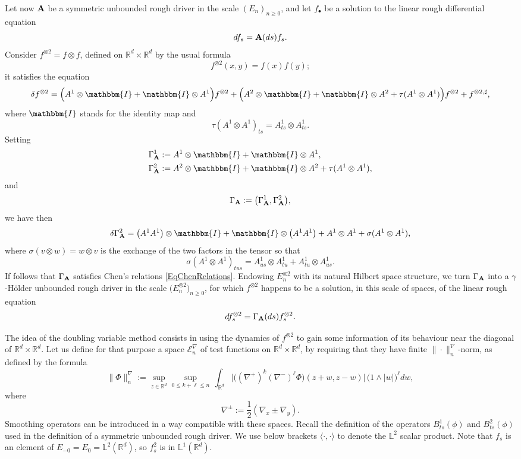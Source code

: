 \documentclass[11pt,a4paper]{amsart}
\newcommand{\RR}{\mathbb{R}}  \newcommand{\CC}{\mathbb{C}}  \newcommand{\LL}{\mathbb{L}}  \newcommand{\WW}{\mathbb{W}}
\newcommand{\mcE}{\mathcal{E}}
\renewcommand{\geq}{\geqslant}
\newcommand{\ssk}{\smallskip}
\numberwithin{equation}{section} %
\begin{document}
\bigskip 
 
Let now $\bf A$ be a symmetric unbounded rough driver in the scale $(E_n)_{n\geq 0}$, and let $f_\bullet$ be a solution to the linear rough differential equation 
$$ 
df_s = {\bf A}(ds)f_s.
$$
Consider $f^{\otimes 2} = f \otimes f$, defined on $\RR^d\times\RR^d$ by the usual formula
$$
f^{\otimes 2}(x,y) = f(x)f(y); 
$$ 
it satisfies the equation
$$ 
\delta f^{\otimes 2} = \Big( A^1  \otimes \mathbbm{I}+\mathbbm{I} \otimes A^1 \Big) f^{\otimes 2} + \Big(A^2 \otimes \mathbbm{I}+\mathbbm{I} \otimes A^2 + \tau (A^1 \otimes A^1)\Big) f^{\otimes 2} + f^{\otimes 2, \sharp},
$$
where $\mathbbm{I}$ stands for the identity map and
$$
\tau (A^1 \otimes A^1)_{t s} = A^1_{t s} \otimes A^1_{t s}.
$$
Setting 
\begin{equation*}
\begin{split}
&\Gamma_{\bfA}^1 := A^1  \otimes \mathbbm{I}+\mathbbm{I} \otimes A^1, \\
&\Gamma_{\bfA}^2 := A^2 \otimes \mathbbm{I}+\mathbbm{I} \otimes A^2 + \tau (A^1 \otimes A^1),
\end{split}
\end{equation*}
and 
$$
\Gamma_{\bf A} := \big(\Gamma_{\bf A}^1, \Gamma_{\bf A}^2\big), 
$$ 
we have then 
$$
\delta \Gamma_{\bfA}^2 = \big(A^1 A^1\big) \otimes \mathbbm{I}+\mathbbm{I} \otimes \big(A^1 A^1\big) + A^1 \otimes A^1 + \sigma (A^1 \otimes A^1),
$$ 
where $\sigma (v \otimes w) = w \otimes v$ is the exchange of the two factors in the tensor so that 
$$
\sigma (A^1 \otimes A^1)_{t u s} = A^1_{us} \otimes A^1_{tu} + A^1_{tu} \otimes A^1_{us}.
$$ 
If follows that $\Gamma_{\bf A}$ satisfies Chen's relations \eqref{EqChenRelations}. Endowing $E_n^{\otimes 2}$ with its natural Hilbert space structure, we turn $\Gamma_{\bf A}$ into a $\gamma$-H\"older unbounded rough driver in the scale $\big(E_n^{\otimes 2}\big)_{n \geq 0}$, for which $f^{\otimes 2}$ happens to be a solution, in this scale of spaces, of the linear rough equation
$$
df^{\otimes 2}_s = \Gamma_{\bf A}(ds)f^{\otimes 2}_s. 
$$

\ssk 

The idea of the doubling variable method consists in using the dynamics of $f^{\otimes 2}$ to gain some information of its behaviour near the diagonal of $\RR^d \times \RR^d$. Let us define for that purpose a space $\mcE^\nabla_n$ of test functions on  $\RR^d \times \RR^d$, by requiring that they have finite $\| \cdot \|^\nabla_n$-norm, as defined by the formula
$$
\| \Phi \|^\nabla_n := \sup_{z\in\RR^d} \sup_{0 \leqslant k + \ell \leqslant n}\,\int_{\RR^d} \Big|\big((\nabla^+)^k (\nabla^-)^\ell \Phi \big)(z+w, z-w)\Big|\,\big(1\wedge |w|\big)^\ell dw,
$$ 
where  
$$
\nabla^\pm := \frac{1}{2}(\nabla_x \pm \nabla_y).
$$ 
Smoothing operators can be introduced in a way compatible with these spaces. Recall the definition of the operators $ B^1_{ts}(\phi)$ and $ B^2_{ts}(\phi)$ used in the definition of a symmetric unbounded rough driver. We use below brackets $\langle\cdot,\cdot\rangle$ to denote the $\LL^2$ scalar product. Note that $f_s$ is an element of $E_{-0} = E_0 = \LL^2(\RR^d)$, so $f_s^2$ is in $\LL^1(\RR^d)$. 
 
\end{document}

